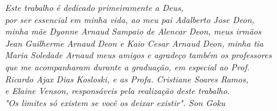 \begin{dedicatoria}
   \vspace*{\fill}
   \centering
   \noindent

   \textit{Este trabalho é dedicado primeiramente a Deus,\\
   por ser essencial em minha vida, ao meu pai Adalberto Jose Deon, \\
   minha mãe Dyonne Arnaud Sampaio de Alencar Deon, meus irmãos \\
   Jean Guilherme Arnaud Deon e Kaio Cesar Arnaud Deon, minha tia \\
   Maria Soledade Arnaud meus amigos e agradeço também os professores \\
   que me acompanharam durante a graduação, em especial ao Prof. \\
   Ricardo Ajax Dias Kosloski, e as Profa. Cristiane Soares Ramos, \\
   e Elaine Venson, responsáveis pela realização deste trabalho. \\
   "Os limites só existem se você os deixar existir". Son Goku} \vspace*{\fill}
\end{dedicatoria}
